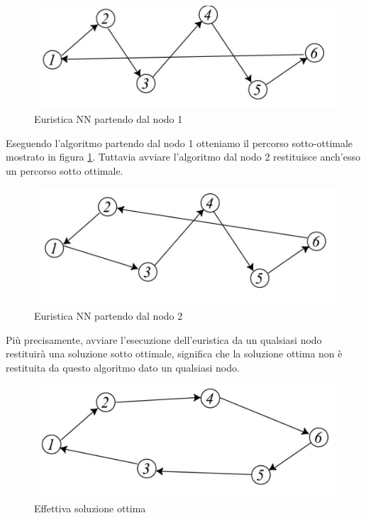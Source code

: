 \documentclass{article}
\begin{document}
\begin{figure}[H]
    \centering
    \includegraphics[scale=0.4]{images/nume_exampl-NN-tsp1.png}
    \caption{Euristica NN partendo dal nodo 1}
    \label{fig:NN1}
\end{figure}
Eseguendo l'algoritmo partendo dal nodo 1 otteniamo il percorso sotto-ottimale mostrato in figura
\ref{fig:NN1}. Tuttavia avviare l'algoritmo dal nodo 2 restituisce anch'esso un percorso sotto ottimale.
\begin{figure}[H]
    \centering
    \includegraphics[scale=0.4]{images/nume_exampl-NN-tsp2.png}
    \caption{Euristica NN partendo dal nodo 2}
\end{figure}
Più precisamente, avviare l'esecuzione dell'euristica da un qualsiasi nodo restituirà una soluzione
sotto ottimale, significa che la soluzione ottima non è restituita da questo algoritmo dato un
qualsiasi nodo.
\begin{figure}
    \centering
    \includegraphics[scale=0.4]{images/nume_exampl-NN-tsp3.png}
    \caption{Effettiva soluzione ottima}
\end{figure}
\end{document}
